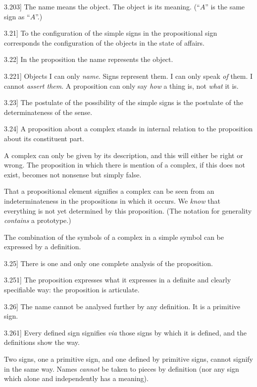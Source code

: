 \documentclass[12pt,oneside]{book}[2007/10/19]
\newcommand{\PropositionE}[2]{%
  \item[\phantomsection\label{PropE:#1}\PropGRef{#1}] #2%
}
\newcommand{\PropGRef}[1]{\hyperref[PropG:#1]{#1}}
\begin{document}
\begin{propositions}
\PropositionE{3.203}
{The name means the object. The object is its
meaning. (``$A$'' is the same sign as ``$A$''.)}


\PropositionE{3.21}
{To the configuration of the simple signs in the
propositional sign corresponds the configuration
\enlargethispage{12pt} %
of the objects in the state of affairs.}


\PropositionE{3.22}
{In the proposition the name represents the object.}


\PropositionE{3.221}
{Objects I can only \emph{name}. Signs represent them.
I can only speak \emph{of} them. I cannot \emph{assert them}.
A proposition can only say \emph{how} a thing is, not
\emph{what} it is.}


\PropositionE{3.23}
{The postulate of the possibility of the simple
signs is the postulate of the determinateness of
the sense.}


\PropositionE{3.24}
{A proposition about a complex stands in
internal relation to the proposition about its
constituent part.

A complex can only be given by its description,
and this will either be right or wrong. The proposition
in which there is mention of a complex,
if this does not exist, becomes not nonsense but
simply false.

That a propositional element signifies a complex
can be seen from an indeterminateness in the propositions
in which it occurs. We \emph{know} that everything
is not yet determined by this proposition.
(The notation for generality \emph{contains} a prototype.)

The combination of the symbols of a complex
in a simple symbol can be expressed by a definition.}


\PropositionE{3.25}
{There is one and only one complete analysis of
the proposition.}


\PropositionE{3.251}
{The proposition expresses what it expresses in
a definite and clearly specifiable way: the proposition
is articulate.}


\PropositionE{3.26}
{The name cannot be analysed further by any
definition. It is a primitive sign.}


\PropositionE{3.261}
{Every defined sign signifies \emph{via} those signs
by which it is defined, and the definitions show
the way.

Two signs, one a primitive sign, and one
defined by primitive signs, cannot signify in the
same way. Names \emph{cannot} be taken to pieces by
definition (nor any sign which alone and independently
has a meaning).}



\end{propositions}
\end{document}
